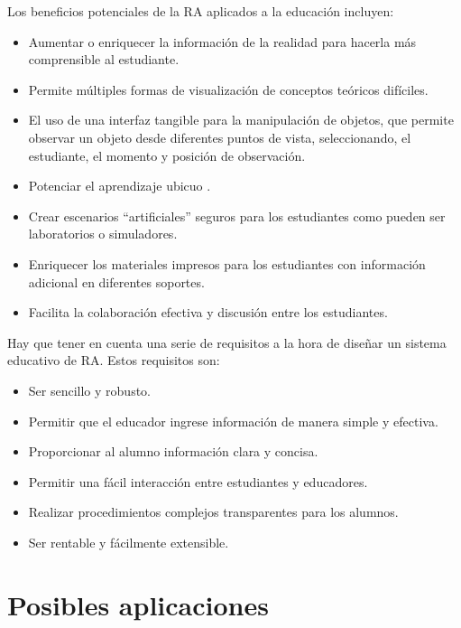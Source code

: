 Los beneficios potenciales de la RA aplicados a la educación incluyen:
\begin{itemize}

    \item Aumentar o enriquecer la información de la realidad para hacerla más comprensible al estudiante.
    
    \item Permite múltiples formas de visualización de conceptos teóricos difíciles.

    \item El uso de una interfaz tangible para la manipulación de objetos, que permite observar un objeto desde diferentes puntos de vista,
    seleccionando, el estudiante, el momento y posición de observación.

    \item Potenciar el aprendizaje ubicuo \cite{URL::AprendizajeUbicuo}.
    
    
    \item Crear escenarios “artificiales” seguros para los estudiantes
    como pueden ser laboratorios o simuladores. 

    \item Enriquecer los materiales impresos para los estudiantes con información adicional en diferentes soportes.
    
    \item Facilita la colaboración efectiva y discusión entre los estudiantes.
\end{itemize}

Hay que tener en cuenta una serie de requisitos a la hora de diseñar un sistema educativo de RA. Estos requisitos son:

\begin{itemize}
    \item Ser sencillo y robusto.
    \item Permitir que el educador ingrese información de manera simple y efectiva.
    \item Proporcionar al alumno información clara y concisa.
    \item Permitir una fácil interacción entre estudiantes y educadores.
    \item Realizar procedimientos complejos transparentes para los alumnos.
    \item Ser rentable y fácilmente extensible.
\end{itemize}


\section{Posibles aplicaciones}

